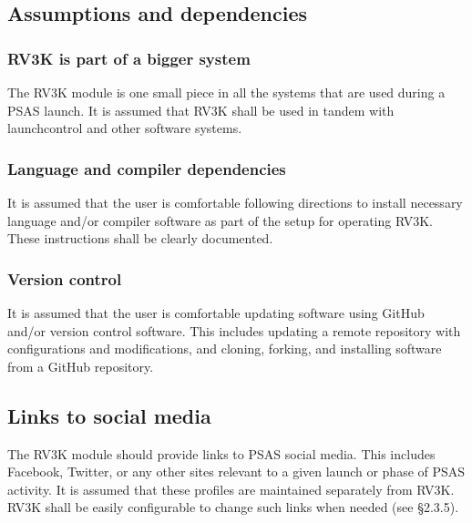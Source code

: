 \subsection{Assumptions and dependencies}
\subsubsection{RV3K is part of a bigger system}
  The RV3K module is one small piece in all the systems that are used during
  a PSAS launch. It is assumed that RV3K shall be used in tandem with launchcontrol
  and other software systems.

\subsubsection{Language and compiler dependencies}
  It is assumed that the user is comfortable following directions to install necessary
  language and/or compiler software as part of the setup for operating RV3K. These
  instructions shall be clearly documented.

\subsubsection{Version control}
  It is assumed that the user is comfortable updating software using GitHub and/or
  version control software. This includes updating a remote repository with configurations
  and modifications, and cloning, forking, and installing software from a GitHub repository.


\subsection{Links to social media}
  The RV3K module should provide links to PSAS social media. This includes Facebook,
  Twitter, or any other sites relevant to a given launch or phase of PSAS activity.
  It is assumed that these profiles are maintained separately from RV3K. RV3K shall
  be easily configurable to change such links when needed (see \S 2.3.5).
